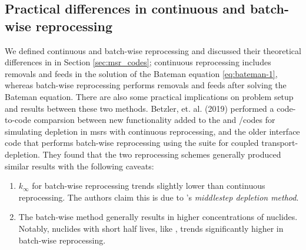 \subsection{Practical differences in continuous and batch-wise reprocessing}
We defined continuous and batch-wise reprocessing and discussed their
theoretical differences in in Section \ref{sec:msr_codes}; continuous reprocessing
includes removals and feeds in the solution of the Bateman equation \ref{eq:bateman-1},
whereas batch-wise reprocessing performs removals and feeds after solving the Bateman
equation. There are also some
practical implications on problem setup and results between these two methods.
Betzler, et. al. (2019) \cite{betzler_molten_2019} performed a code-to-code
comparsion between new functionality added to the \ORIGEN and \SCALE/\TRITON codes
for simulating depletion in \Gls{msr}s with continuous reprocessing, and the
older \ChemTriton \cite{betzler_molten_2017} interface code that performs
batch-wise reprocessing using the \SCALE suite for coupled transport-depletion.
They found that the two reprocessing schemes generally produced similar results
with the following caveats:
\begin{enumerate}
    \item $k_{\infty}$ for batch-wise reprocessing trends slightly lower than  continuous reprocessing. The authors claim this is due to \SCALE's {\it middlestep depletion method}. 
    \item The batch-wise method generally results in higher concentrations of nuclides. Notably, nuclides with short half lives, like , trends significantly higher in batch-wise reprocessing.
\end{enumerate}


